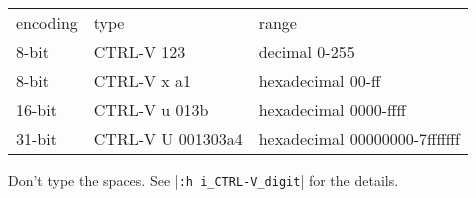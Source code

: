 \begin{center} \begin{tabular}{l l l}
				encoding & type & range \\
				8-bit & CTRL-V 123 & decimal 0-255 \\
				8-bit & CTRL-V x a1 & hexadecimal 00-ff \\
				16-bit & CTRL-V u 013b & hexadecimal 0000-ffff \\
				31-bit & CTRL-V U 001303a4 & hexadecimal 00000000-7fffffff \\
\end{tabular} \end{center}

Don't type the spaces.
See |\texttt{:h i\_CTRL-V\_digit}| for the details.
\clearpage
